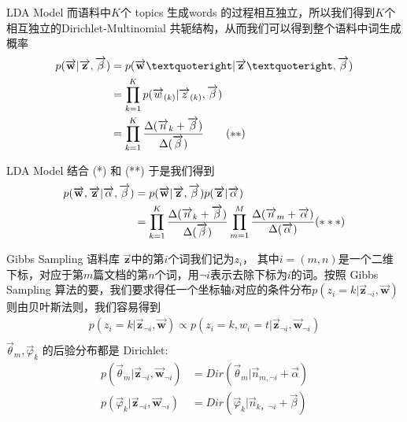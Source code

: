 \documentclass{beamer}
\begin{document}
\begin{CJK*}{UTF8}{gbsn}
\begin{frame}{LDA Model}
而语料中$K$个 topics 生成words 的过程相互独立，所以我们得到$K$个相互独立的Dirichlet-Multinomial 共轭结构，从而我们可以得到整个语料中词生成概率
\begin{align*}
p(\overrightarrow{\mathbf{w}} |\overrightarrow{\mathbf{z}},\overrightarrow{\beta}) &= p(\overrightarrow{\mathbf{w}}’ |\overrightarrow{\mathbf{z}}’,\overrightarrow{\beta}) \notag \\
&= \prod_{k=1}^K p(\overrightarrow{w}_{(k)} | \overrightarrow{z}_{(k)}, \overrightarrow{\beta}) \notag \\
&= \prod_{k=1}^K \frac{\Delta(\overrightarrow{n}_k+\overrightarrow{\beta})}{\Delta(\overrightarrow{\beta})}  \quad\quad (**)
\end{align*}
\end{frame}



\begin{frame}{LDA Model}
结合 (*)  和 (**) 于是我们得到
\begin{align*}
p(\overrightarrow{\mathbf{w}},\overrightarrow{\mathbf{z}} |\overrightarrow{\alpha}, \overrightarrow{\beta}) &=
p(\overrightarrow{\mathbf{w}} |\overrightarrow{\mathbf{z}}, \overrightarrow{\beta}) p(\overrightarrow{\mathbf{z}} |\overrightarrow{\alpha}) \notag \\
&= \prod_{k=1}^K \frac{\Delta(\overrightarrow{n}_k+\overrightarrow{\beta})}{\Delta(\overrightarrow{\beta})}
\prod_{m=1}^M \frac{\Delta(\overrightarrow{n}_m+\overrightarrow{\alpha})}{\Delta(\overrightarrow{\alpha})}   (***)
\end{align*}
\end{frame}




\begin{frame}{Gibbs Sampling}
语料库
$\overrightarrow{\mathbf{z}}$中的第$i$个词我们记为$z_i$， 其中$i=(m,n)$是一个二维下标，对应于第$m$篇文档的第$n$个词，用$\neg i$表示去除下标为$i$的词。按照 Gibbs Sampling 算法的要，我们要求得任一个坐标轴$i$对应的条件分布$p(z_i = k|\overrightarrow{\mathbf{z}}_{\neg i},\overrightarrow{\mathbf{w}})$则由贝叶斯法则，我们容易得到
\begin{align*}
p(z_i = k|\overrightarrow{\mathbf{z}}_{\neg i}, \overrightarrow{\mathbf{w}}) \propto
p(z_i = k, w_i = t |\overrightarrow{\mathbf{z}}_{\neg i}, \overrightarrow{\mathbf{w}}_{\neg i}) \\
\end{align*}
$\overrightarrow{\theta}_m, \overrightarrow{\varphi}_k$
的后验分布都是 Dirichlet:
\begin{align*}
p(\overrightarrow{\theta}_m|\overrightarrow{\mathbf{z}}_{\neg i}, \overrightarrow{\mathbf{w}}_{\neg i})
&= Dir(\overrightarrow{\theta}_m| \overrightarrow{n}_{m,\neg i} + \overrightarrow{\alpha}) \\
p(\overrightarrow{\varphi}_k|\overrightarrow{\mathbf{z}}_{\neg i}, \overrightarrow{\mathbf{w}}_{\neg i})
&= Dir( \overrightarrow{\varphi}_k| \overrightarrow{n}_{k，\neg i} + \overrightarrow{\beta})
\end{align*}
\end{frame}




\end{CJK*}
\end{document}

